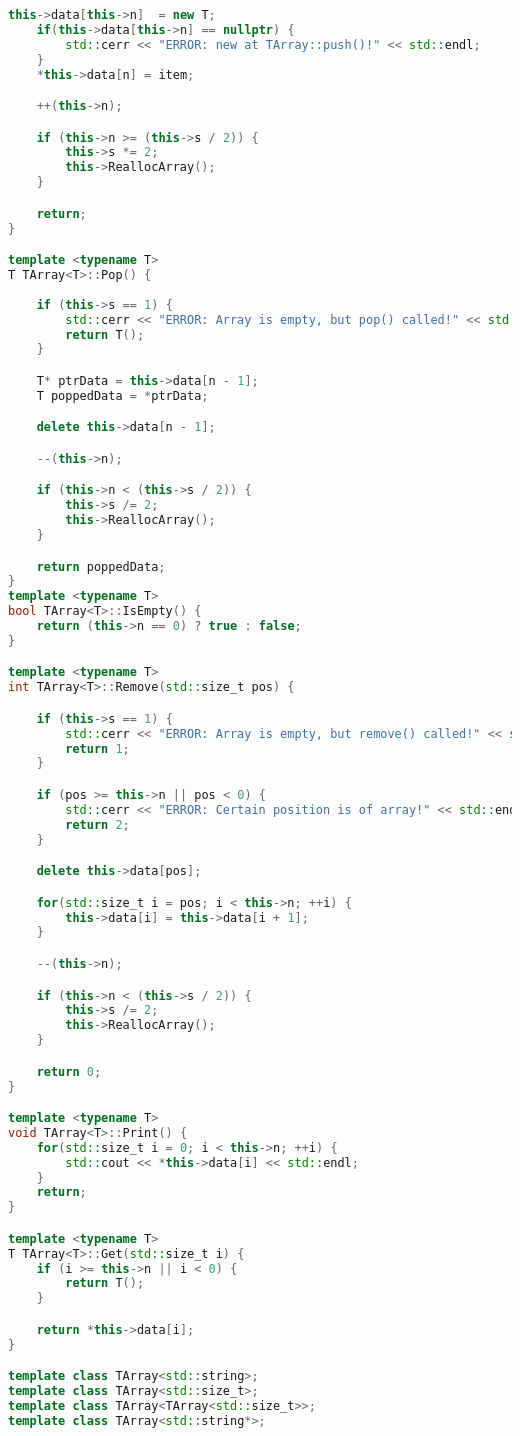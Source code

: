 \begin{lstlisting}[language=C++]
    this->data[this->n]  = new T;
    if(this->data[this->n] == nullptr) {
        std::cerr << "ERROR: new at TArray::push()!" << std::endl;
    }
    *this->data[n] = item;

    ++(this->n);

    if (this->n >= (this->s / 2)) {
        this->s *= 2;
        this->ReallocArray();
    }

    return;
}

template <typename T>
T TArray<T>::Pop() {
    
    if (this->s == 1) {
        std::cerr << "ERROR: Array is empty, but pop() called!" << std::endl;
        return T();
    }

    T* ptrData = this->data[n - 1];
    T poppedData = *ptrData;

    delete this->data[n - 1];

    --(this->n);

    if (this->n < (this->s / 2)) {
        this->s /= 2;
        this->ReallocArray();
    }

    return poppedData;
}
template <typename T>
bool TArray<T>::IsEmpty() {
    return (this->n == 0) ? true : false;
}

template <typename T>
int TArray<T>::Remove(std::size_t pos) {

    if (this->s == 1) {
        std::cerr << "ERROR: Array is empty, but remove() called!" << std::endl;
        return 1;
    }

    if (pos >= this->n || pos < 0) {
        std::cerr << "ERROR: Certain position is of array!" << std::endl;
        return 2;
    }

    delete this->data[pos];

    for(std::size_t i = pos; i < this->n; ++i) {
        this->data[i] = this->data[i + 1];
    }

    --(this->n);

    if (this->n < (this->s / 2)) {
        this->s /= 2;
        this->ReallocArray();
    }

    return 0;
}

template <typename T>
void TArray<T>::Print() {
    for(std::size_t i = 0; i < this->n; ++i) {
        std::cout << *this->data[i] << std::endl;
    }
    return;
}

template <typename T>
T TArray<T>::Get(std::size_t i) {
    if (i >= this->n || i < 0) {
        return T();
    }

    return *this->data[i];
}

template class TArray<std::string>;
template class TArray<std::size_t>;
template class TArray<TArray<std::size_t>>;
template class TArray<std::string*>;


\end{lstlisting}
